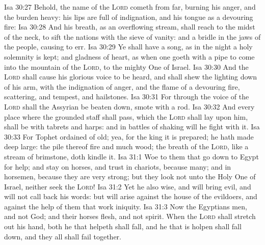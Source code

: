\vs Isa 30:27 Behold, the name of the \textsc{Lord} cometh from far, burning  his anger, and the burden  heavy: his lips are full of indignation, and his tongue as a devouring fire:
\vs Isa 30:28 And his breath, as an overflowing stream, shall reach to the midst of the neck, to sift the nations with the sieve of vanity: and  a bridle in the jaws of the people, causing  to err.
\vs Isa 30:29 Ye shall have a song, as in the night  a holy solemnity is kept; and gladness of heart, as when one goeth with a pipe to come into the mountain of the \textsc{Lord}, to the mighty One of Israel.
\vs Isa 30:30 And the \textsc{Lord} shall cause his glorious voice to be heard, and shall shew the lighting down of his arm, with the indignation of  anger, and  the flame of a devouring fire,  scattering, and tempest, and hailstones.
\vs Isa 30:31 For through the voice of the \textsc{Lord} shall the Assyrian be beaten down,  smote with a rod.
\vs Isa 30:32 And  every place where the grounded staff shall pass, which the \textsc{Lord} shall lay upon him,  shall be with tabrets and harps: and in battles of shaking will he fight with it.
\vs Isa 30:33 For Tophet  ordained of old; yea, for the king it is prepared; he hath made  deep  large: the pile thereof  fire and much wood; the breath of the \textsc{Lord}, like a stream of brimstone, doth kindle it.
\vs Isa 31:1 Woe to them that go down to Egypt for help; and stay on horses, and trust in chariots, because  many; and in horsemen, because they are very strong; but they look not unto the Holy One of Israel, neither seek the \textsc{Lord}!
\vs Isa 31:2 Yet he also  wise, and will bring evil, and will not call back his words: but will arise against the house of the evildoers, and against the help of them that work iniquity.
\vs Isa 31:3 Now the Egyptians  men, and not God; and their horses flesh, and not spirit. When the \textsc{Lord} shall stretch out his hand, both he that helpeth shall fall, and he that is holpen shall fall down, and they all shall fail together.
